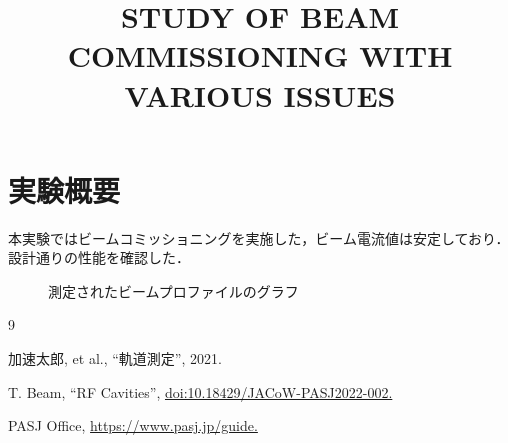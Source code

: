 \documentclass{article}
\begin{document}
\title{STUDY OF BEAM COMMISSIONING WITH VARIOUS ISSUES}




\maketitle

\section{実験概要}
本実験ではビームコミッショニングを実施した，ビーム電流値は安定しており．設計通りの性能を確認した．

\begin{figure}[htb]
\caption{測定されたビームプロファイルのグラフ}
\end{figure}

\begin{table}[htb]
\caption{測定パラメータの一覧表}
\end{table}

\begin{thebibliography}{9}

加速太郎, et al., ``軌道測定'', 2021.

T. Beam, ``RF Cavities'', \url{doi:10.18429/JACoW-PASJ2022-002.}

PASJ Office, \url{https://www.pasj.jp/guide.}

\end{thebibliography}
\end{document}
